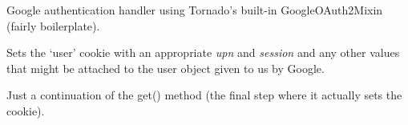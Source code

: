 \documentclass[letterpaper,10pt,openany]{sphinxmanual}
\begin{document}

\begin{fulllineitems}
\label{Developer/authentication:gateone.auth.authentication.GoogleAuthHandler}
Google authentication handler using Tornado's built-in GoogleOAuth2Mixin
(fairly boilerplate).

\begin{fulllineitems}
\label{Developer/authentication:gateone.auth.authentication.GoogleAuthHandler.get}
Sets the `user' cookie with an appropriate \emph{upn} and \emph{session} and any
other values that might be attached to the user object given to us by
Google.

\end{fulllineitems}


\begin{fulllineitems}
\label{Developer/authentication:gateone.auth.authentication.GoogleAuthHandler._on_auth}
Just a continuation of the get() method (the final step where it
actually sets the cookie).

\end{fulllineitems}


\end{fulllineitems}

\end{document}

